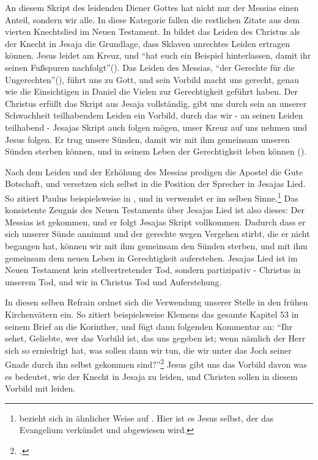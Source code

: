 An diesem Skript des leidenden Diener Gottes hat nicht nur der Messias einen Anteil, sondern wir alle. In diese Kategorie fallen die restlichen Zitate aus dem vierten Knechtslied im Neuen Testament.
In  bildet das Leiden des Christus als der Knecht in Jesaja die Grundlage, dass Sklaven unrechtes Leiden ertragen können.
Jesus leidet am Kreuz, und ``hat euch ein Beispiel hinterlassen, damit ihr seinen Fußspuren nachfolgt''().
Das Leiden des Messias, ``der Gerechte für die Ungerechten''(), führt uns zu Gott, und sein Vorbild macht uns gerecht, genau wie die Einsichtigen
in Daniel die Vielen zur Gerechtigkeit geführt haben.
Der Christus erfüllt das Skript aus Jesaja vollständig, gibt uns durch sein an unserer Schwachheit teilhabendem Leiden ein Vorbild, durch das wir - an seinen Leiden teilhabend -
Jesajas Skript auch folgen mögen, unser Kreuz auf uns nehmen und Jesus folgen.
Er trug unsere Sünden, damit wir mit ihm gemeinsam unseren Sünden sterben können, und in seinem Leben der Gerechtigkeit leben können ().

Nach dem Leiden und der Erhöhung des Messias predigen die Apostel die Gute Botschaft, und versetzen sich selbst in die Position der Sprecher in Jesajas Lied.
So zitiert Paulus beispielsweise  in , und in  verwendet er  im selben Sinne.\footnote{
	 bezieht sich in ähnlicher Weise auf . Hier ist es Jesus selbst, der das Evangelium verkündet und abgewiesen wird.
}
Das konsistente Zeugnis des Neuen Testaments über Jesajas Lied ist also dieses:
Der Messias ist gekommen, und er folgt Jesajas Skript vollkommen.
Dadurch dass er sich unserer Sünde annimmt und der gerechte wegen Vergehen stirbt, die er nicht begangen hat,
können wir mit ihm gemeinsam den Sünden sterben, und mit ihm gemeinsam dem neuen Leben in Gerechtigkeit auferstehen.
Jesajas Lied ist im Neuen Testament kein stellvertretender Tod, sondern partizipativ - Christus in unserem Tod, und wir in Christus Tod und Auferstehung.

In diesen selben Refrain ordnet sich die Verwendung unserer Stelle in den frühen Kirchenvätern ein. So zitiert beispielsweise Klemens das gesamte Kapitel 53 in seinem Brief an die Korinther,
und fügt dann folgenden Kommentar an: ``Ihr sehet, Geliebte, wer das Vorbild ist, das uns gegeben ist; wenn nämlich der Herr sich so erniedrigt hat, was sollen dann wir tun, die wir unter das Joch seiner Gnade durch ihn selbst gekommen sind?''\Footcite[16:17]{clement-epistula-ad-corinthios}
Jesus gibt uns das Vorbild davon was es bedeutet, wie der Knecht in Jesaja zu leiden, und Christen sollen in diesem Vorbild mit leiden.

